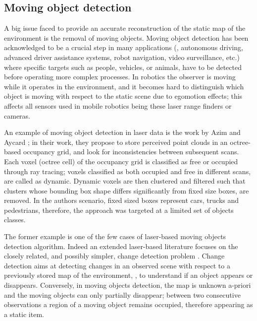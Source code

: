 \subsection{Moving object detection}
A big issue faced to provide an accurate reconstruction of the static map of the environment is the removal of moving objects.
Moving object detection has been acknowledged to be a crucial step in many applications (\eg, autonomous driving, advanced driver assistance systems, robot navigation, video surveillance, etc.) where specific targets such as  people, vehicles, or animals, have to be detected before operating more complex processes.
In robotics the observer is moving while it operates in the environment, and it becomes hard to distinguish which object is moving with respect to the static scene due to egomotion effects; this affects all sensors used in mobile robotics being these laser range finders or cameras.


An example of moving object detection in laser data is the work by Azim and Aycard \cite{azim2012detection}; in their work, they propose to store perceived point clouds in an octree-based occupancy grid, and look for inconsistencies between subsequent scans. Each voxel (octree cell) of the occupancy grid is classified as free or occupied through ray tracing; voxels classified as both occupied and free in different scans, are called as dynamic. 
Dynamic voxels are then clustered and filtered such that clusters whose bounding box shape differs significantly from fixed size boxes, are removed. In the authors scenario, fixed sized boxes represent cars, trucks and pedestrians, therefore, the approach was targeted at a limited set of objects classes.

The former example is one of the few cases of laser-based moving objects detection algorithm. Indeed an extended laser-based literature focuses on the closely related, and possibly simpler, change detection problem \cite{vieira2014spatial,andreasson2007has,drews2013fast,xiao2013change}.
Change detection  aims at detecting changes in an observed scene with respect to a previously stored map of the environment, \eg, to understand if an object appears or disappears. 
Conversely, in moving objects detection, the map is unknown a-priori and the moving objects can only partially disappear; between two consecutive observations a region of a moving object remains occupied, therefore appearing as a static item.

